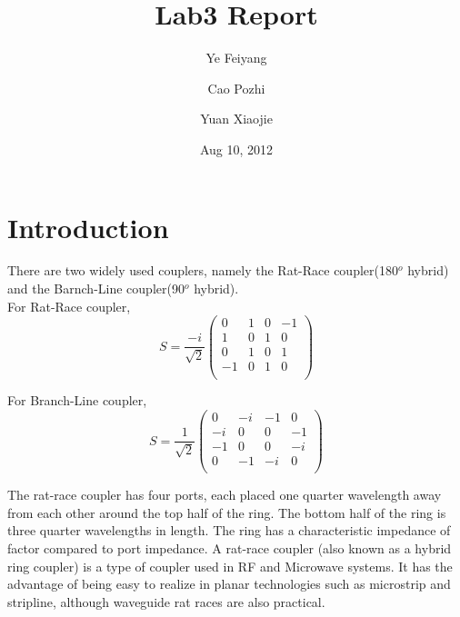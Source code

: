 \documentclass[11pt,a4paper]{report}
\begin{document}
\title{Lab3 Report}

\author{Ye Feiyang \and Cao Pozhi \and Yuan Xiaojie}

\date{Aug 10, 2012}

\maketitle

\section*{Introduction}
There are two widely used couplers, namely the Rat-Race coupler(180\(^o\) hybrid) and the Barnch-Line coupler(90\(^o\) hybrid).\\

For Rat-Race coupler, \\
\begin{equation}
S = \frac{-i}{\sqrt{2}}
\left(
\begin{array}{cccc}
0 & 1 & 0 & -1 \\
1 & 0 & 1 & 0 \\
0 & 1 & 0 & 1 \\
-1 & 0 & 1 & 0 \\
\end{array}
\right)
\end{equation}

For Branch-Line coupler, \\
\begin{equation}
S = \frac{1}{\sqrt{2}}
\left(
\begin{array}{cccc}
0 & -i & -1 & 0 \\
-i & 0 & 0 & -1 \\
-1 & 0 & 0 & -i \\
0 & -1 & -i & 0 \\
\end{array}
\right)
\end{equation}

The rat-race coupler has four ports, each placed one quarter wavelength away from each other around the top half of the ring. The bottom half of the ring is three quarter wavelengths in length. The ring has a characteristic impedance of factor compared to port impedance.
A rat-race coupler (also known as a hybrid ring coupler) is a type of coupler used in RF and Microwave systems. It has the advantage of being easy to realize in planar technologies such as microstrip and stripline, although waveguide rat races are also practical. \\
\end{document}
